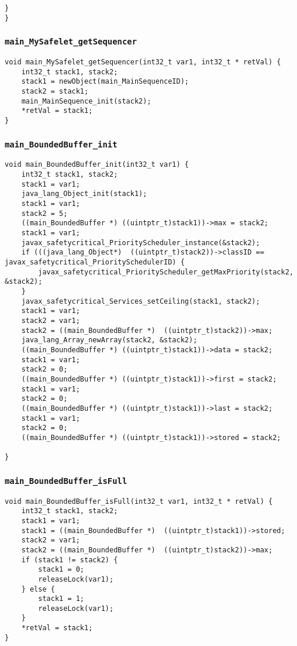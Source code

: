 \begin{landscape}
\begin{multicols}{2}
\begin{lstlisting}[firstnumber=1676]
	}
}
\end{lstlisting}

\subsubsection{\texttt{main\_MySafelet\_getSequencer}}

\begin{lstlisting}[firstnumber=1710]
void main_MySafelet_getSequencer(int32_t var1, int32_t * retVal) {
	int32_t stack1, stack2;
	stack1 = newObject(main_MainSequenceID);
	stack2 = stack1;
	main_MainSequence_init(stack2);
	*retVal = stack1;
}
\end{lstlisting}

\subsubsection{\texttt{main\_BoundedBuffer\_init}}

\begin{lstlisting}[firstnumber=1763]
void main_BoundedBuffer_init(int32_t var1) {
	int32_t stack1, stack2;
	stack1 = var1;
	java_lang_Object_init(stack1);
	stack1 = var1;
	stack2 = 5;
	((main_BoundedBuffer *) ((uintptr_t)stack1))->max = stack2;
	stack1 = var1;
	javax_safetycritical_PriorityScheduler_instance(&stack2);
	if (((java_lang_Object*)  ((uintptr_t)stack2))->classID == javax_safetycritical_PrioritySchedulerID) {
		javax_safetycritical_PriorityScheduler_getMaxPriority(stack2, &stack2);
	}
	javax_safetycritical_Services_setCeiling(stack1, stack2);
	stack1 = var1;
	stack2 = var1;
	stack2 = ((main_BoundedBuffer *)  ((uintptr_t)stack2))->max;
	java_lang_Array_newArray(stack2, &stack2);
	((main_BoundedBuffer *) ((uintptr_t)stack1))->data = stack2;
	stack1 = var1;
	stack2 = 0;
	((main_BoundedBuffer *) ((uintptr_t)stack1))->first = stack2;
	stack1 = var1;
	stack2 = 0;
	((main_BoundedBuffer *) ((uintptr_t)stack1))->last = stack2;
	stack1 = var1;
	stack2 = 0;
	((main_BoundedBuffer *) ((uintptr_t)stack1))->stored = stack2;

}
\end{lstlisting}

\subsubsection{\texttt{main\_BoundedBuffer\_isFull}}

\begin{lstlisting}[firstnumber=1820]
void main_BoundedBuffer_isFull(int32_t var1, int32_t * retVal) {
	int32_t stack1, stack2;
	stack1 = var1;
	stack1 = ((main_BoundedBuffer *)  ((uintptr_t)stack1))->stored;
	stack2 = var1;
	stack2 = ((main_BoundedBuffer *)  ((uintptr_t)stack2))->max;
	if (stack1 != stack2) {
		stack1 = 0;
		releaseLock(var1);
	} else {
		stack1 = 1;
		releaseLock(var1);
	}
	*retVal = stack1;
}
\end{lstlisting}


\end{multicols}
\end{landscape}
